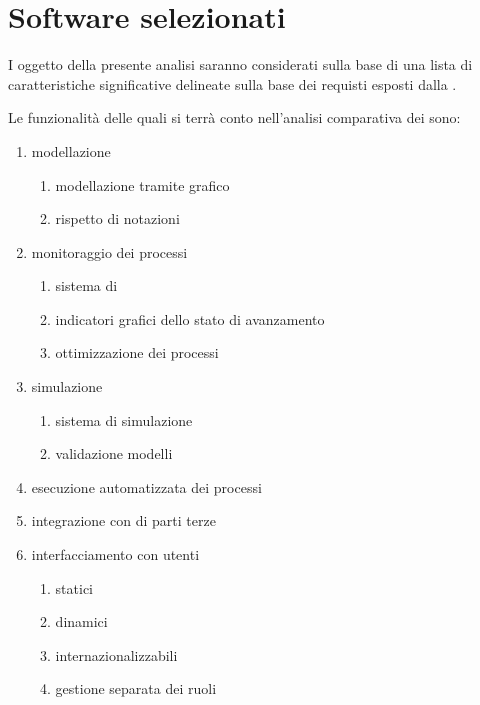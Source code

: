 \clearpage

\section{Software selezionati}
	I \sw oggetto della presente analisi saranno considerati sulla base di una lista di caratteristiche significative delineate sulla base dei requisti esposti dalla \customer.
	
	Le funzionalità delle quali si terrà conto nell'analisi comparativa dei \sw sono:
	
\begin{enumerate}
\renewcommand{\labelenumi}{\arabic{enumi}}		
\renewcommand{\labelenumii}{\arabic{enumi}.\arabic{enumii}}
  \item modellazione
 	\begin{enumerate}
	  \item modellazione tramite  grafico
	  \item rispetto di notazioni 	
	\end{enumerate}
	\item monitoraggio dei processi
		\begin{enumerate}
		  \item sistema di 
		  \item indicatori grafici dello stato di avanzamento
		  \item ottimizzazione dei processi	
		\end{enumerate}		
	\item simulazione
		\begin{enumerate}
		  \item sistema di  simulazione
		  \item validazione modelli 	
		\end{enumerate}
	\item esecuzione automatizzata dei processi
	\item integrazione con \sw di parti terze
	\item interfacciamento con utenti
	\begin{enumerate}
	  \item {} statici
	  \item {} dinamici
	  \item {} internazionalizzabili
	  \item gestione separata dei ruoli 			
	\end{enumerate}
\end{enumerate}

